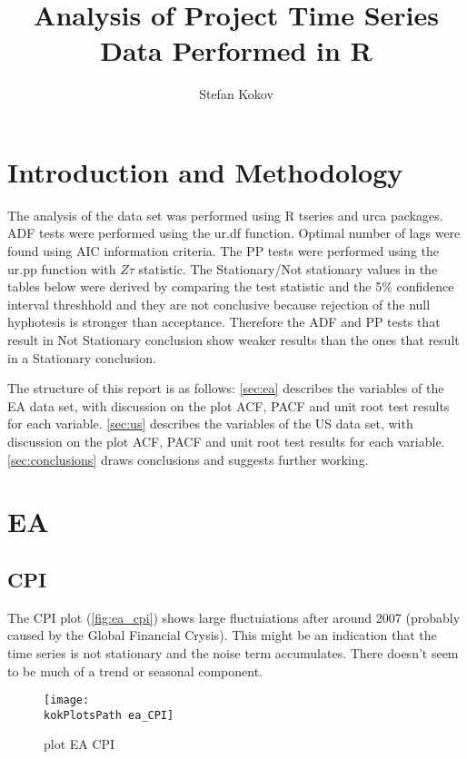 \documentclass[10pt]{article}
\title{Analysis of Project Time Series Data Performed in R}
\author{Stefan Kokov}
\def \kokDataAnalysisPath {../../data/analysis/}
\def \kokPlotsPath {\kokDataAnalysisPath plots/}
\begin{document}
\maketitle



\section{Introduction and Methodology}
The analysis of the data set was performed using R tseries and urca packages.
ADF tests were performed using the ur.df function. Optimal number of lags were found using AIC information criteria. The PP tests were performed using the ur.pp function with $Z\tau$ statistic. The Stationary/Not stationary values in the tables below were derived by comparing the test statistic and the 5$\%$ confidence interval threshhold and they are not conclusive because rejection of the null hyphotesis is stronger than acceptance. Therefore the ADF and PP tests that result in Not Stationary conclusion show weaker results than the ones that result in a Stationary conclusion.

The structure of this report is as follows: \autoref{sec:ea} describes the variables of the EA data set, with discussion on the plot ACF, PACF and unit root test results for each variable. \autoref{sec:us} describes the variables of the US data set, with discussion on the plot ACF, PACF and unit root test results for each variable. \autoref{sec:conclusions} draws conclusions and suggests further working.



\pagebreak



\section{EA}
\label{sec:ea}


\subsection{CPI}
The CPI plot (\autoref{fig:ea_cpi}) shows large fluctuiations after around 2007 (probably caused by the Global Financial Crysis). This might be an indication that the time series is not stationary and the noise term accumulates. There doesn't seem to be much of a trend or seasonal component.

\begin{figure}[h!]
\centering
\texttt{[image: \\kokPlotsPath ea\_CPI]}
\caption{plot EA CPI}
\label{fig:ea_cpi}
\end{figure}
\end{document}
